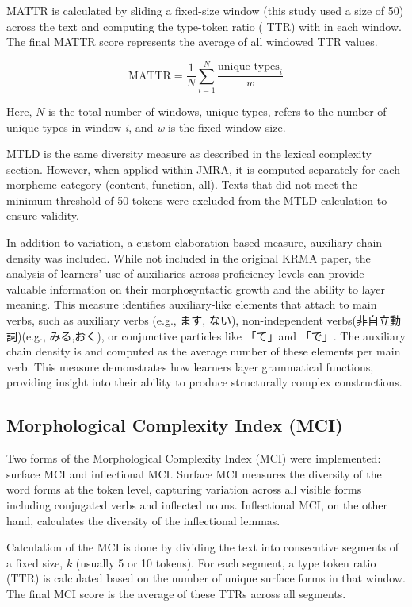MATTR is calculated by sliding a fixed-size window (this study used a size of 50) across the text and computing the
type-token ratio (
TTR) with in each window. The final MATTR score represents the average of all windowed TTR values.

\begin{equation}
    \text{MATTR} = \frac{1}{N} \sum_{i=1}^{N} \frac{\text{unique types}_i}{w}
\end{equation}

Here, $N$ is the total number of windows, unique types, refers to the number of unique types in window \textit{i}, and
\textit{w} is
the
fixed window size.

MTLD is the same diversity measure as described in the lexical complexity section. However, when applied within
JMRA, it is computed separately for each morpheme category (content, function, all). Texts that did not meet the
minimum threshold of 50 tokens were excluded from the MTLD calculation to ensure validity.

In addition to variation, a custom elaboration-based measure, auxiliary chain density was included. While not
included in the original KRMA paper, the analysis of learners' use of auxiliaries across proficiency levels can
provide valuable
information on their morphosyntactic growth and the ability to layer meaning.
This measure
identifies auxiliary-like elements that attach to main verbs, such as
auxiliary verbs (e.g., ます, ない), non-independent verbs(非自立動詞)(e.g., みる,おく), or conjunctive particles like 「て」and 「で」. The
auxiliary chain density is and
computed as the
average
number of these elements per main verb. This measure demonstrates how learners layer grammatical functions,
providing insight into their ability to produce structurally complex constructions.

\subsection{Morphological Complexity Index (MCI)}

Two forms of the Morphological Complexity Index (MCI) were implemented:
surface
MCI and
inflectional MCI. Surface MCI measures the diversity of the word forms at the token level, capturing variation
across all visible forms including conjugated verbs and inflected nouns. Inflectional MCI, on the other hand,
calculates the diversity of
the inflectional lemmas.

Calculation of the MCI is done by dividing the text into consecutive segments of a fixed size, $k$ (usually 5
or 10
tokens). For each segment, a type token ratio (TTR) is calculated based on the number of unique surface forms in
that window. The final MCI score is the average of these TTRs across all segments.

